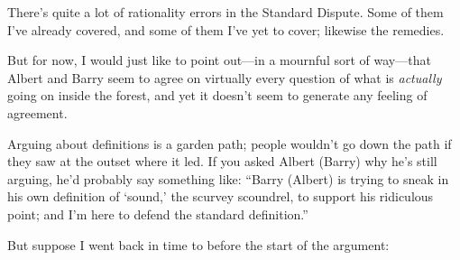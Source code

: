 {
 There's quite a lot of rationality errors in the
Standard Dispute. Some of them I've already covered,
and some of them I've yet to cover; likewise the
remedies.}

{
 But for now, I would just like to point out---in a mournful sort
of way---that Albert and Barry seem to agree on virtually every
question of what is \textit{actually} going on inside the forest, and
yet it doesn't seem to generate any feeling of
agreement.}

{
 Arguing about definitions is a garden path; people
wouldn't go down the path if they saw at the outset
where it led. If you asked Albert (Barry) why he's
still arguing, he'd probably say something like:
``Barry (Albert) is trying to sneak in his own
definition of `sound,' the scurvey
scoundrel, to support his ridiculous point; and I'm
here to defend the standard definition.''}

{
 But suppose I went back in time to before the start of the
argument:}

